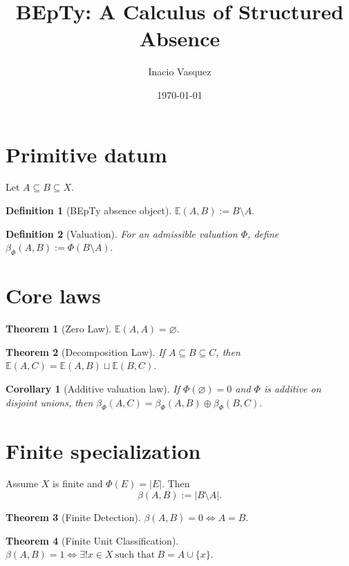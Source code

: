 \documentclass[11pt]{article}
\title{BEpTy: A Calculus of Structured Absence}
\author{Inacio Vasquez}
\date{\today}
\newtheorem{definition}{Definition}
\newtheorem{theorem}{Theorem}
\newtheorem{corollary}{Corollary}
\begin{document}
\maketitle

\section{Primitive datum}

Let \(A \subseteq B \subseteq X\).

\begin{definition}[BEpTy absence object]
\(\mathbb E(A,B) := B \setminus A.\)
\end{definition}

\begin{definition}[Valuation]
For an admissible valuation \(\Phi\), define
\(\beta_\Phi(A,B) := \Phi(B \setminus A).\)
\end{definition}

\section{Core laws}

\begin{theorem}[Zero Law]
\(\mathbb E(A,A)=\varnothing.\)
\end{theorem}

\begin{theorem}[Decomposition Law]
If \(A \subseteq B \subseteq C\), then
\(\mathbb E(A,C)=\mathbb E(A,B)\sqcup \mathbb E(B,C).\)
\end{theorem}

\begin{corollary}[Additive valuation law]
If \(\Phi(\varnothing)=0\) and \(\Phi\) is additive on disjoint unions, then
\(\beta_\Phi(A,C)=\beta_\Phi(A,B)\oplus \beta_\Phi(B,C).\)
\end{corollary}

\section{Finite specialization}

Assume \(X\) is finite and \(\Phi(E)=|E|\). Then
\[
\beta(A,B):=|B\setminus A|.
\]

\begin{theorem}[Finite Detection]
\(\beta(A,B)=0 \iff A=B.\)
\end{theorem}

\begin{theorem}[Finite Unit Classification]
\(\beta(A,B)=1 \iff \exists !x\in X\ \text{such that}\ B=A\cup\{x\}.\)
\end{theorem}
\end{document}
